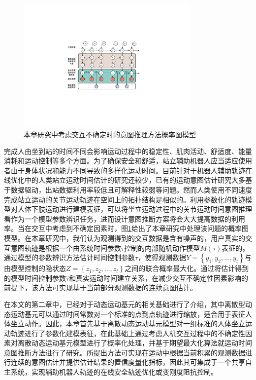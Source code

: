 \begin{figure}[htb]
    \centering\includegraphics[width=0.8\textwidth]{figures/4-Fig-Intro.pdf}
    \caption{本章研究中考虑交互不确定时的意图推理方法概率图模型}
    \label{fig:4-Intro}
\end{figure}

完成人由坐到站的时间不同会影响运动过程中的稳定性、肌肉活动、舒适度、能量消耗和运动控制等多个方面。为了确保安全和舒适，站立辅助机器人应当适应使用者由于身体状况和能力不同导致的多样化运动时间。目前针对于机器人辅助轨迹在线优化中的人类站立运动时间估计的研究还较少，已有的运动意图估计研究大多基于数据驱动，出站数据利用率较低且可解释性较弱等问题。然而人类使用不同速度完成站立运动的关节运动轨迹在空间上的拓扑结构是相似的。利用参数化的轨迹模型对人体下肢运动进行建模表征，可以将坐立运动过程中的关节运动时间意图推理看作为一个模型参数辨识任务，进而设计意图推断方案将会大大提高数据的利用率。当在交互中考虑到不确定因素时，图\ref{fig:4-Intro}给出了本章研究中处理该问题的概率图模型。在本章研究中，我们认为观测得到的交互数据是含有噪声的，用户真实的交互意图轨迹是根据一个由系统时间参数$\tau$控制的内部随机动作模型$M(\tau)$表征的。通过模型的参数辨识方法估计时间控制参数$\tau$，使得观测数据$Y=\left\{y_1,y_2,...,y_t\right\}$与由模型控制的隐状态$Z=\left\{z_1,z_2,...,z_t\right\}$之间的联合概率最大化。通过将估计得到的模型时间控制参数$\hat \tau$和真实运动时间建立关系，在减少交互不确定性因素影响的前提下，该方法可实现基于当前部分观测数据的连续意图估计。

在本文的第二章中，已经对于动态运动基元的相关基础进行了介绍，其中离散型动态运动基元可以通过时间常数对一个标准的点到点轨迹进行缩放，适合用于表征人体坐立动作。因此，本章首先基于离散动态运动基元模型对一组标准的人体坐立运动轨迹进行了参数化建模表征，在此基础上通过考虑人机交互过程中的不确定性因素对离散动态运动基元模型进行了概率化处理，并基于期望最大化算法就运动时间意图推断方法进行了研究。所提出方法可实现在运动中根据当前积累的观测数据进行连续的意图估计并提供估计结果的置信度量化指标，因此其可集成于一个共享自主系统，实现辅助机器人轨迹的在线安全轨迹优化或变刚度阻抗控制。
